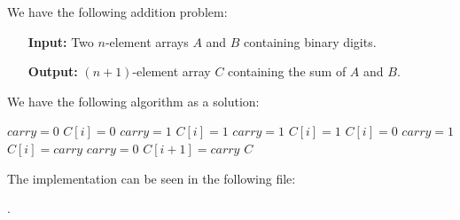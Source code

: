 
We have the following addition problem:

\begin{itemize}
    \item[\textbf{Input:}] Two $n$-element arrays $A$ and $B$ containing binary digits.
    \item[\textbf{Output:}] $(n+1)$-element array $C$ containing the sum of $A$ and $B$.
\end{itemize}

We have the following algorithm as a solution:

\begin{algorithmic}[1]
    \STATE $\mathit{carry} = 0$
                \STATE $C[i] = 0$
                \STATE $\mathit{carry} = 1$
            \ELSE
                \STATE $C[i] = 1$
                \STATE $\mathit{carry} = 1$
            \ENDIF
                \STATE $C[i] = 1$
            \ELSE
                \STATE $C[i] = 0$
                \STATE $\mathit{carry} = 1$
            \ENDIF
        \ELSE
            \STATE $C[i] = \mathit{carry}$
            \STATE $\mathit{carry} = 0$
        \ENDIF
    \ENDFOR
    \STATE $C[i + 1] = \mathit{carry}$
    \RETURN $C$
\end{algorithmic}

The implementation can be seen in the following file:

.
